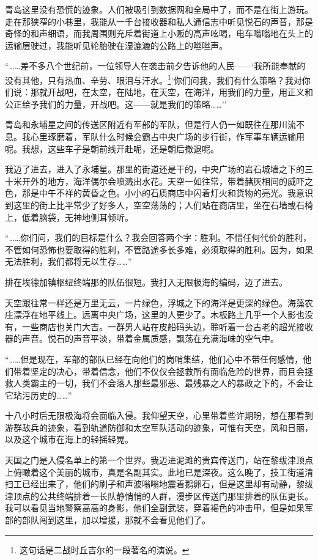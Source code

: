 \documentclass[AutoFakeBold=true]{book}
\begin{document}
青岛这里没有恐慌的迹象。人们被吸引到数据网和全局中了，而不是在街上游玩。走在那狭窄的小巷里，我能从一千台接收器和私人通信志中听见悦石的声音，那是奇怪的和声细语，而我周围则充斥着街道上小贩的高声吆喝，电车嗡嗡地在头上的运输层驶过，我能听见轮胎驶在湿漉漉的公路上的咝咝声。

``……差不多八个世纪前，一位领导人在袭击前夕告诉他的人民——`我所能奉献的没有其他，只有热血、辛劳、眼泪与汗水。\footnote{这句话是二战时丘吉尔的一段著名的演说。}'你们问我，我们有什么策略？我对你们说：那就开战吧，在太空，在陆地，在天空，在海洋，用我们的力量，用正义和公正给予我们的力量，开战吧。这——就是我们的策略……''

青岛和永埔星之间的传送区附近有军部的军队，但是行人仍一如既往在那川流不息。我心里琢磨着，军队什么时候会霸占中央广场的步行街，作军事车辆运输用呢。我想，这些车子是朝前线开赴呢，还是朝后撤退呢。

我迈了进去，进入了永埔星。那里的街道还是干的，中央广场的岩石城墙之下的三十米开外的地方，海洋偶尔会喷溅出水花。天空一如往常，带着赭灰相间的威吓之色，那是中午不祥的黄昏之色。小小的石质商店中闪着灯火和货物的亮光。我意识到这里的街上比平常少了好多人，空空荡荡的；人们站在商店里，坐在石墙或石椅上，低着脑袋，无神地侧耳倾听。

``……你们问，我们的目标是什么？我会回答两个字：胜利。不惜任何代价的胜利，不管如何恐怖也要取得的胜利，不管路途多长多难，必须取得的胜利。因为，如果无法胜利，我们都将无以生存……''

排在埃德加镇枢纽终端那的队伍很短。我打入无限极海的编码，迈了进去。

天空跟往常一样还是万里无云，一片绿色，浮城之下的海洋是更深的绿色。海藻农庄漂浮在地平线上。远离中央广场，这里的人更少了。木板路上几乎一个人影也没有，一些商店也关门大吉。一群男人站在皮船码头边，聆听着一台古老的超光接收器的声音。悦石的声音平淡，带着金属质感，飘荡在充满海味的空气中。

``……但是现在，军部的部队已经在向他们的岗哨集结，他们心中不带任何感情，他们带着坚定的决心，带着信念，他们不仅仅会拯救所有面临危险的世界，而且会拯救人类霸主的一切，我们不会落人那些最邪恶、最残暴之人的暴政之下的，不会让它玷污历史的……''

十八小时后无限极海将会面临入侵。我仰望天空，心里带着些许期盼，想在那看到游群敌兵的迹象，看到轨道防御和太空军队活动的迹象，可惟有天空，风和日丽，以及这个城市在海上的轻摇轻晃。

天国之门是入侵名单上的第一个世界。我迈进泥滩的贵宾传送门，站在黎绂津顶点上俯瞰着这个美丽的城市，真是名副其实。此地已是深夜。这么晚了，技工街道清扫工已经出来了，他们的刷子和声波嗡嗡地震着鹅卵石，但是这里却有动静，黎绂津顶点的公共终端排着一长队静悄悄的人群，漫步区传送门那里排着的队伍更长。我可以看见当地警察高高的身影，他们全副武装，穿着褐色的冲击甲，但是如果军部的部队闯到这里，加以增援，那就不会看见他们了。
\end{document}
